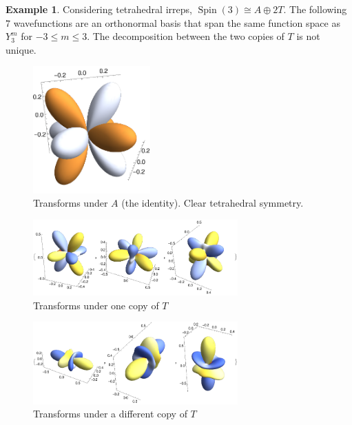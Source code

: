 \documentclass[12pt, letterpaper]{article}
\theoremstyle{definition} %
\newtheorem{ex}[thm]{Example}
\begin{document}
\begin{ex}
  Considering tetrahedral irreps, $\operatorname{Spin}(3)\cong A\oplus 2T$. The following $7$ wavefunctions are an orthonormal basis
  that span the same function space as $Y_3^m$ for $-3\leq m\leq 3$. The decomposition between the two copies of $T$ is not unique.
\begin{figure}[H]
\centering
\includegraphics[width=0.4\textwidth]{spindecomptet1}
\caption{Transforms under $A$ (the identity). Clear tetrahedral symmetry.}
\label{figure-spintet1}
\end{figure}

\begin{figure}[H]
\centering
\includegraphics[width=0.7\textwidth]{spindecomptet2}
\caption{Transforms under one copy of  $T$}
\label{figure-spintet2}
\end{figure}
\begin{figure}[H]
\centering
\includegraphics[width=0.7\textwidth]{spindecomptet3}
\caption{Transforms under a different copy of $T$}
\label{figure-spintet3}
\end{figure}
\end{ex}
\end{document}
